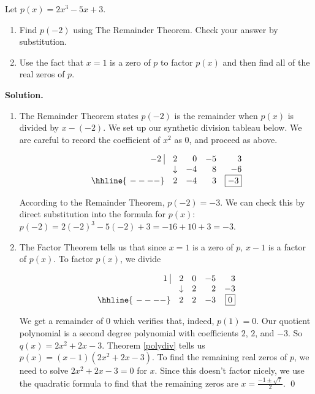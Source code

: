 \begin{ex} Let $p(x) = 2x^3-5x+3$.

\begin{enumerate}

\item  Find $p(-2)$ using The Remainder Theorem.  Check your answer by substitution.

\item  Use the fact that $x=1$ is a zero of $p$ to factor $p(x)$ and then find all of the real zeros of $p$.

\end{enumerate}

{\bf Solution.}

\begin{enumerate}

\item  The Remainder Theorem states $p(-2)$ is the remainder when $p(x)$ is divided by $x-(-2)$.  We set up our synthetic division tableau below.  We are careful to record the coefficient of $x^2$ as $0$, and proceed as above.

\[\begin{array}{rrrrr}
 -2 \, \, \vline& 2 & 0 & -5  & 3 \\

   & \downarrow &  -4  &  8  & -6 \\ \hhline{~----} 
  & 2  &   -4  & 3 &  \fbox{$-3$}  \\  
\end{array}\]

According to the Remainder Theorem, $p(-2) = -3$.  We can check this by direct substitution into the formula for $p(x)$:  $p(-2) = 2(-2)^3-5(-2)+3 = -16+10+3=-3$.

\item The Factor Theorem tells us that since $x=1$ is a zero of $p$, $x-1$ is a factor of $p(x)$.  To factor $p(x)$, we divide

\[\begin{array}{rrrrr}
 1 \, \, \vline& 2 & 0 & -5  & 3 \\

   & \downarrow &  2  &  2  & -3 \\ \hhline{~----} 
  & 2  &   2  & -3 &  \fbox{$0$}  \\  
\end{array}\]

We get a remainder of $0$ which verifies that, indeed, $p(1) = 0$.  Our quotient polynomial is a second degree polynomial with coefficients $2$, $2$, and $-3$. So $q(x) = 2x^2 + 2x - 3$.  Theorem \ref{polydiv} tells us $p(x) = (x-1)\left( 2x^2 + 2x - 3\right)$.  To find the remaining real zeros of $p$, we need to solve $2x^2 + 2x - 3=0$ for $x$.  Since this doesn't factor nicely, we use the quadratic formula to find that the remaining zeros are $x = \frac{-1 \pm \sqrt{7}}{2}$. \qed
\end{enumerate}
\end{ex}

